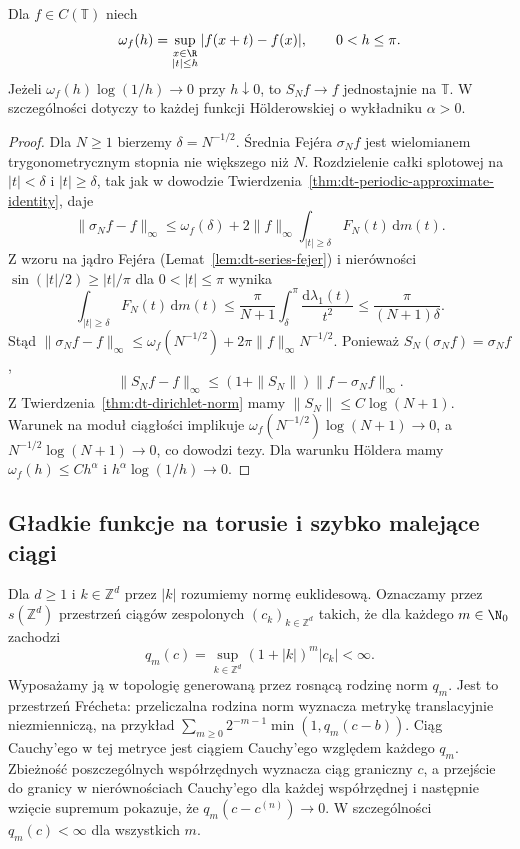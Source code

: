 \begin{twierdzenie}
\label{thm:dt-dini-lipschitz}
Dla $f\in C(\mathbb T)$ niech
\[
 \omega_f(h)=\sup_{\substack{x\in\R\\|t|\le h}}
 |f(x+t)-f(x)|,\qquad 0<h\le\pi.
\]
Jeżeli $\omega_f(h)\log(1/h)\to0$ przy $h\downarrow0$,
to $S_Nf\to f$ jednostajnie na $\mathbb T$.
W szczególności dotyczy to każdej funkcji
Hölderowskiej o wykładniku $\alpha>0$.
\end{twierdzenie}
\begin{proof}
Dla $N\ge1$ bierzemy $\delta=N^{-1/2}$.
Średnia Fejéra $\sigma_Nf$ jest wielomianem
trygonometrycznym stopnia nie większego niż $N$.
Rozdzielenie całki splotowej na $|t|<\delta$
i $|t|\ge\delta$, tak jak w dowodzie
Twierdzenia~\ref{thm:dt-periodic-approximate-identity},
daje
\[
 \|\sigma_Nf-f\|_\infty
 \le\omega_f(\delta)+
 2\|f\|_\infty\int_{|t|\ge\delta}F_N(t)\,\mathrm dm(t).
\]
Z wzoru na jądro Fejéra
(Lemat~\ref{lem:dt-series-fejer})
i nierówności $\sin(|t|/2)\ge |t|/\pi$
dla $0<|t|\le\pi$ wynika
\[
 \int_{|t|\ge\delta} F_N(t)\,\mathrm dm(t)
 \le\frac{\pi}{N+1}\int_\delta^\pi
 \frac{\mathrm d\lambda_1(t)}{t^2}
 \le\frac{\pi}{(N+1)\delta}.
\]
Stąd
$\|\sigma_Nf-f\|_\infty\le
\omega_f(N^{-1/2})+2\pi\|f\|_\infty N^{-1/2}$.
Ponieważ $S_N(\sigma_Nf)=\sigma_Nf$,
\[
 \|S_Nf-f\|_\infty
 \le(1+\|S_N\|)\|f-\sigma_Nf\|_\infty.
\]
Z Twierdzenia~\ref{thm:dt-dirichlet-norm}
mamy $\|S_N\|\le C\log(N+1)$.
Warunek na moduł ciągłości implikuje
$\omega_f(N^{-1/2})\log(N+1)\to0$,
a $N^{-1/2}\log(N+1)\to0$, co dowodzi tezy.
Dla warunku Höldera mamy $\omega_f(h)\le C h^\alpha$
i $h^\alpha\log(1/h)\to0$.
\end{proof}

\subsection{Gładkie funkcje na torusie i szybko malejące ciągi}

Dla $d\ge1$ i $k\in\mathbb Z^d$ przez $|k|$
rozumiemy normę euklidesową. Oznaczamy przez
$s(\mathbb Z^d)$ przestrzeń ciągów zespolonych
$(c_k)_{k\in\mathbb Z^d}$ takich, że dla każdego
$m\in\N_0$ zachodzi
\[
 q_m(c)=\sup_{k\in\mathbb Z^d}(1+|k|)^m|c_k|<\infty.
\]
Wyposażamy ją w topologię generowaną przez
rosnącą rodzinę norm $q_m$. Jest to przestrzeń
Frécheta: przeliczalna rodzina norm wyznacza
metrykę translacyjnie niezmienniczą, na przykład
$\sum_{m\ge0}2^{-m-1}\min(1,q_m(c-b))$.
Ciąg Cauchy'ego w tej metryce jest ciągiem
Cauchy'ego względem każdego $q_m$.
Zbieżność poszczególnych współrzędnych wyznacza
ciąg graniczny $c$, a przejście do granicy
w nierównościach Cauchy'ego dla każdej
współrzędnej i następnie wzięcie supremum
pokazuje, że $q_m(c-c^{(n)})\to0$.
W szczególności $q_m(c)<\infty$ dla wszystkich $m$.


